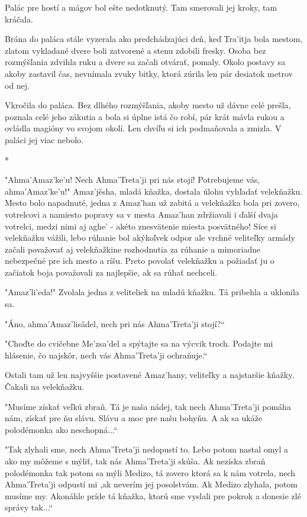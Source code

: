 \documentclass{book}
\begin{document}
Palác pre hostí a mágov bol ešte nedotknutý. Tam smerovali jej kroky, tam kráčala.

 Brána do paláca stále vyzerala ako predchádzajúci deň, keď Tra'itja bola mestom, zlatom vykladané dvere boli zatvorené a stenu zdobili fresky. Osoba bez rozmýšľania zdvihla ruku a dvere sa začali otvárať, pomaly. Okolo postavy sa akoby zastavil čas, nevnímala zvuky bitky, ktorá zúrila len pár desiatok metrov od nej.

Vkročila do paláca. Bez dlhého rozmýšľania, akoby mesto už dávne celé prešla, poznala celé jeho zákutia a bola si úplne istá čo robí, pár krát mávla rukou a ovládla magióny vo svojom okolí. Len chvíľu si ich podmaňovala a zmizla. V paláci jej viac nebolo.

\begin{center}
*
\end{center}

"$ $Ahma'Amaz'ke'u! Nech Ahma'Treta'ji pri nás stojí! Potrebujeme vás, ahma'Amaz'ke'u!"$ $ Amaz'je\v{}sha, mladá kňažka, dostala úlohu vyhľadať velekňažku. Mesto bolo napadnuté, jedna z Amaz'han už zabitá a velekňažka bola pri zovero, votrelcovi a namiesto popravy sa v mesta Amaz'han zdržiavali i ďalší dvaja votrelci, medzi nimi aj aghe' - akéto znesvätenie miesta posvätného! Síce si velekňažku vážili, lebo rúhanie bol akýkoľvek odpor ale vrchné veliteľky armády začali považovať aj velekňažkine rozhodnutia za rúhanie a mimoriadne nebezpečné pre ich mesto a ríšu. Preto povolať velekňažku a požiadať ju o začiatok boja považovali za najlepšie, ak sa rúhať nechceli.

"$ $Amaz'li'eda!"$ $ Zvolala jedna z veliteliek na mladú kňažku. Tá pribehla a uklonila sa.

"$ $Áno, ahma'Amaz'lisa\v{}del, nech pri nás Ahma'Treta'ji stojí?“

"$ $Choďte do cvičebne Me'zsa'del a spýtajte sa na výcvik troch. Podajte mi hlásenie, čo najskôr, nech vás Ahma'Treta'ji ochraňuje.“

Ostali tam už len najvyššie postavené Amaz'hany, veliteľky a najstaršie kňažky. Čakali na velekňažku.

"$ $Musíme získať veľkú zbraň. Tá je naša nádej, tak nech Ahma'Treta'ji pomáha nám, získať pre ňu slávu. Slávu a moc pre našu bohyňu. A ak sa ukáže polodémonka ako neschopná...“

"$ $Tak zlyhali sme, nech Ahma'Treta'ji nedopustí to. Lebo potom nastal omyl a ako my môžeme s mýliť, tak nás Ahma'Treta'ji skúša. Ak nezíska zbraň polodémonka tak potom sa mýli Medizo, tá zovero ktorá sa k nám votrela, nech Ahma'Treta'ji odpustí mi ,ak neverím jej posolstvám. Ak Medizo zlyhala, potom musíme my. Akonáhle príde tá kňažka, ktorú sme vyslali pre pokrok a donesie zlé správy tak...“
\end{document}
